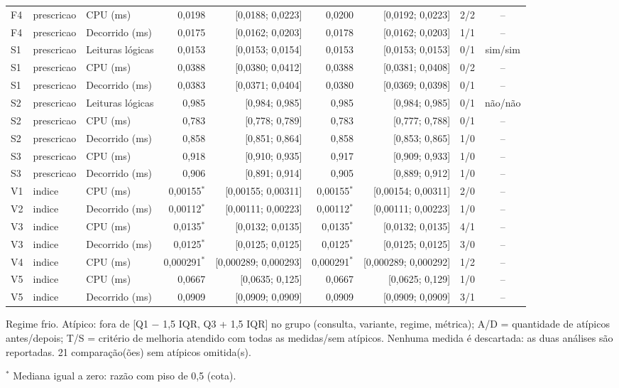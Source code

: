 {\begin{tabular}{lllrrrrrc}
F4 & prescricao & CPU (ms) & 0,0198 & [0,0188; 0,0223] & 0,0200 & [0,0192; 0,0223] & 2/2 & -- \\
F4 & prescricao & Decorrido (ms) & 0,0175 & [0,0162; 0,0203] & 0,0178 & [0,0162; 0,0203] & 1/1 & -- \\
S1 & prescricao & Leituras lógicas & 0,0153 & [0,0153; 0,0154] & 0,0153 & [0,0153; 0,0153] & 0/1 & sim/sim \\
S1 & prescricao & CPU (ms) & 0,0388 & [0,0380; 0,0412] & 0,0388 & [0,0381; 0,0408] & 0/2 & -- \\
S1 & prescricao & Decorrido (ms) & 0,0383 & [0,0371; 0,0404] & 0,0380 & [0,0369; 0,0398] & 0/1 & -- \\
S2 & prescricao & Leituras lógicas & 0,985 & [0,984; 0,985] & 0,985 & [0,984; 0,985] & 0/1 & não/não \\
S2 & prescricao & CPU (ms) & 0,783 & [0,778; 0,789] & 0,783 & [0,777; 0,788] & 0/1 & -- \\
S2 & prescricao & Decorrido (ms) & 0,858 & [0,851; 0,864] & 0,858 & [0,853; 0,865] & 1/0 & -- \\
S3 & prescricao & CPU (ms) & 0,918 & [0,910; 0,935] & 0,917 & [0,909; 0,933] & 1/0 & -- \\
S3 & prescricao & Decorrido (ms) & 0,906 & [0,891; 0,914] & 0,905 & [0,889; 0,912] & 1/0 & -- \\
V1 & indice & CPU (ms) & 0,00155$^{*}$ & [0,00155; 0,00311] & 0,00155$^{*}$ & [0,00154; 0,00311] & 2/0 & -- \\
V2 & indice & Decorrido (ms) & 0,00112$^{*}$ & [0,00111; 0,00223] & 0,00112$^{*}$ & [0,00111; 0,00223] & 1/0 & -- \\
V3 & indice & CPU (ms) & 0,0135$^{*}$ & [0,0132; 0,0135] & 0,0135$^{*}$ & [0,0132; 0,0135] & 4/1 & -- \\
V3 & indice & Decorrido (ms) & 0,0125$^{*}$ & [0,0125; 0,0125] & 0,0125$^{*}$ & [0,0125; 0,0125] & 3/0 & -- \\
V4 & indice & CPU (ms) & 0,000291$^{*}$ & [0,000289; 0,000293] & 0,000291$^{*}$ & [0,000289; 0,000292] & 1/2 & -- \\
V5 & indice & CPU (ms) & 0,0667 & [0,0635; 0,125] & 0,0667 & [0,0625; 0,129] & 1/0 & -- \\
V5 & indice & Decorrido (ms) & 0,0909 & [0,0909; 0,0909] & 0,0909 & [0,0909; 0,0909] & 3/1 & -- \\
\bottomrule
\end{tabular}\par
\vspace{3pt}
\begin{minipage}{\linewidth}\footnotesize
Regime frio. Atípico: fora de [Q1 $-$ 1,5 IQR, Q3 + 1,5 IQR] no grupo (consulta, variante, regime, métrica); A/D = quantidade de atípicos antes/depois; T/S = critério de melhoria atendido com todas as medidas/sem atípicos. Nenhuma medida é descartada: as duas análises são reportadas. 21 comparação(ões) sem atípicos omitida(s).\par
$^{*}$ Mediana igual a zero: razão com piso de 0,5 (cota).
\end{minipage}
}
